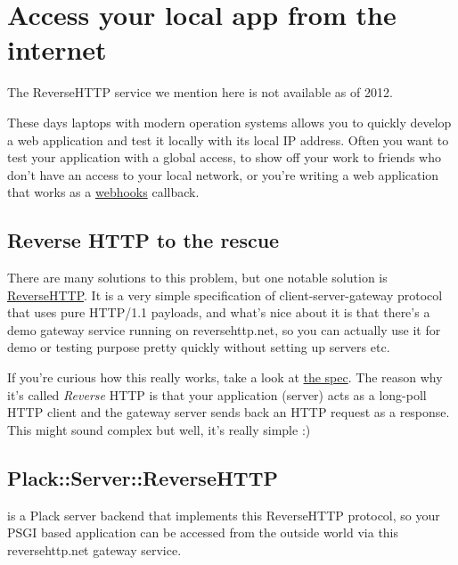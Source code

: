 \chapter{Access your local app from the internet}
\label{day-20-access-your-local-app-from-the-internet}

\begin{note}
  The ReverseHTTP service we mention here is not available as of 2012.
\end{note}

These days laptops with modern operation systems allows you to quickly
develop a web application and test it locally with its local IP address.
Often you want to test your application with a global access, to show
off your work to friends who don't have an access to your local network,
or you're writing a web application that works as a
\href{http://www.webhooks.org/}{webhooks} callback.

\section{Reverse HTTP to the
rescue}\label{reverse-http-to-the-rescue}

There are many solutions to this problem, but one notable solution is
\href{http://www.reversehttp.net/}{ReverseHTTP}. It is a very simple
specification of client-server-gateway protocol that uses pure HTTP/1.1
payloads, and what's nice about it is that there's a demo gateway
service running on reversehttp.net, so you can actually use it for demo
or testing purpose pretty quickly without setting up servers etc.

If you're curious how this really works, take a look at
\href{http://www.reversehttp.net/specs.html}{the spec}. The reason why
it's called \emph{Reverse} HTTP is that your application (server) acts
as a long-poll HTTP client and the gateway server sends back an HTTP
request as a response. This might sound complex but well, it's really
simple :)

\section{Plack::Server::ReverseHTTP}\label{plackserverreversehttp}

\href{http://search.cpan.org/~miyagawa/Plack-Server-ReverseHTTP-0.01/}{}
is a Plack server backend that implements this ReverseHTTP protocol, so
your PSGI based application can be accessed from the outside world via
this reversehttp.net gateway service.

